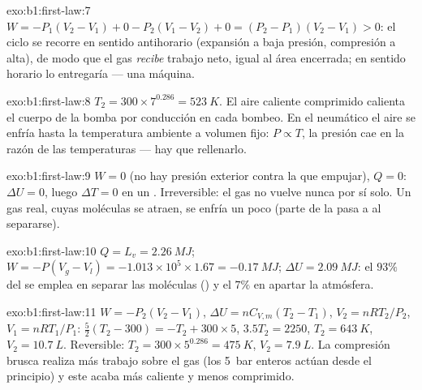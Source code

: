 \begin{solution}{exo:b1:first-law:7}
$W = -P_1(V_2 - V_1) + 0 - P_2(V_1 - V_2) + 0 = (P_2 - P_1)(V_2 - V_1) > 0$:
el ciclo se recorre en sentido antihorario (expansión a baja presión,
compresión a alta), de modo que el gas \emph{recibe} trabajo neto, igual al
área encerrada; en sentido horario lo entregaría --- una máquina.
\end{solution}

\begin{solution}{exo:b1:first-law:8}
$T_2 = 300 \times 7^{0.286} = \qty{523}{K}$. El aire caliente comprimido
calienta el cuerpo de la bomba por conducción en cada bombeo. En el
neumático el aire se enfría hasta la temperatura ambiente a volumen fijo:
$P \propto T$, la presión cae en la razón de las temperaturas --- hay que rellenarlo.
\end{solution}

\begin{solution}{exo:b1:first-law:9}
$W = 0$ (no hay presión exterior contra la que empujar), $Q = 0$: $\Delta U = 0$,
luego $\Delta T = 0$ en un . Irreversible: el gas no vuelve
nunca por sí solo. Un gas real, cuyas moléculas se atraen, se enfría un
poco (parte de la  pasa a  al separarse).
\end{solution}

\begin{solution}{exo:b1:first-law:10}
$Q = L_v = \qty{2.26}{MJ}$; $W = -P(V_g - V_l) = -1.013\times10^5 \times 1.67 =
\qty{-0.17}{MJ}$; $\Delta U = \qty{2.09}{MJ}$: el $93\%$ del  se emplea en
separar las moléculas () y el $7\%$ en apartar la
atmósfera.
\end{solution}

\begin{solution}{exo:b1:first-law:11}
$W = -P_2(V_2 - V_1)$, $\Delta U = nC_{V,m}(T_2 - T_1)$, $V_2 = nRT_2/P_2$, $V_1
= nRT_1/P_1$: $\tfrac52(T_2 - 300) = -T_2 + 300 \times 5$, $3.5T_2 = 2250$,
$T_2 = \qty{643}{K}$, $V_2 = \qty{10.7}{L}$. Reversible: $T_2 = 300 \times
5^{0.286} = \qty{475}{K}$, $V_2 = \qty{7.9}{L}$. La compresión brusca realiza
más trabajo sobre el gas (los \qty{5}{bar} enteros actúan desde el
principio) y este acaba más caliente y menos comprimido.
\end{solution}

